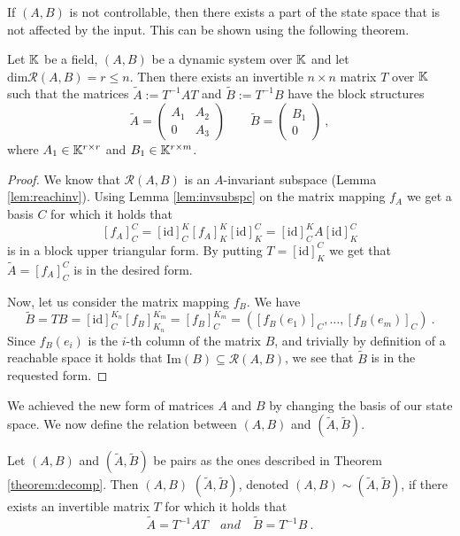 If $(A,B)$ is not controllable, then there exists a part of the state space that is not affected by the input. This can be shown using the following theorem.

\begin{theorem}
	\label{theorem:decomp}
	Let $\mathbb{K}$ be a field, $(A,B)$ be a dynamic system over $\mathbb{K}$ and let $\text{dim}\mathcal{R}(A,B)=r\leq n$. Then there exists an invertible $n\times n$ matrix $T$ over $\mathbb{K}$ such that the matrices $\widetilde{A}:=T^{-1}AT$ and $\widetilde{B}:=T^{-1}B$ have the block structures 
	\begin{equation}
		\label{eq:decomp}
		\widetilde{A}=
		\begin{pmatrix}
			A_1 & A_2 \\
			0   & A_3 
		\end{pmatrix}
		\qquad
		\widetilde{B}=
		\begin{pmatrix}
			B_1  \\
			0
		\end{pmatrix}\ ,
	\end{equation}
	where $A_1\in\mathbb{K}^{r \times r}$ and $B_1\in\mathbb{K}^{r \times m}$.
\end{theorem}

\begin{proof}
	We know that $\mathcal{R}(A,B)$ is an $A$-invariant subspace (Lemma \ref{lem:reachinv}). Using Lemma \ref{lem:invsubspc} on the matrix mapping $f_A$ we get a basis $C$ for which it holds that 
	$$[f_A]^C_C=[\text{id}]^K_C[f_A]^K_K[\text{id}]^C_K=[\text{id}]^K_CA[\text{id}]^C_K$$ 
	is in a block upper triangular form. By putting $T=[\text{id}]^C_K$ we get that $\widetilde{A}=[f_A]^C_C$ is in the desired form.

	Now, let us consider the matrix mapping $f_B$. We have
	$$\widetilde{B}=TB=[\text{id}]^{K_n}_C[f_B]^{K_m}_{K_n}=[f_B]^{K_m}_C=([f_B(e_1)]_C,\ldots,[f_B(e_m)]_C)\ .$$
	Since $f_B(e_i)$ is the $i$-th column of the matrix $B$, and trivially by definition of a reachable space it holds that $\text{Im}(B)\subseteq \mathcal{R}(A,B)$, we see that $\widetilde{B}$ is in the requested form.
\end{proof}

We achieved the new form of matrices $A$ and $B$ by changing the basis of our state space. We now define the relation between $(A,B)$ and $(\widetilde{A},\widetilde{B}).$

\begin{definition}
	Let $(A,B)$ and $(\widetilde{A},\widetilde{B})$ be pairs as the ones described in Theorem \ref{theorem:decomp}. Then $(A,B)$  $(\widetilde{A},\widetilde{B})$, denoted $(A,B) \sim (\widetilde{A},\widetilde{B})$, if there exists an invertible matrix $T$ for which it holds that
	$$\widetilde{A}=T^{-1}AT\quad and\quad\widetilde{B}=T^{-1}B\ .$$
\end{definition}

